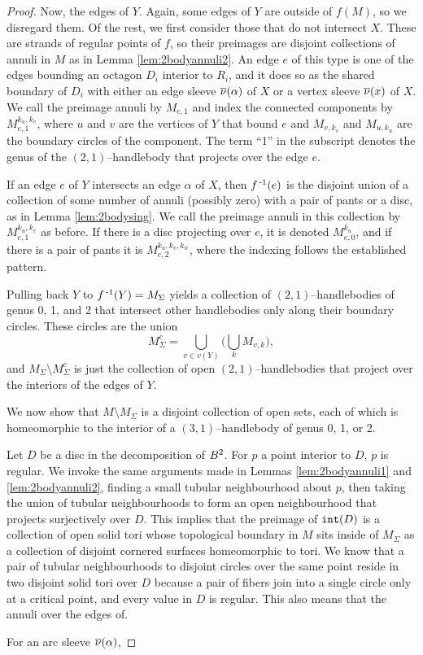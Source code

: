 \begin{proof}
	Now, the edges of $Y$.
	Again, some edges of $Y$ are outside of $f(M)$, so we disregard them.
	Of the rest, we first consider those that do not intersect $X$.
	These are strands of regular points of $f$, so their preimages are disjoint collections of annuli in $M$ as in Lemma \ref{lem:2bodyannuli2}.
	An edge $e$ of this type is one of the edges bounding an octagon $D_i$ interior to $R_i$, and it does so as the shared boundary of $D_i$ with either an edge sleeve $\overline{\nu}(\alpha)$ of $X$ or a vertex sleeve $\overline{\nu}(x)$ of $X$.
	We call the preimage annuli by $M_{e,1}$ and index the connected components by $M_{e,1}^{k_u,k_v}$, where $u$ and $v$ are the vertices of $Y$ that bound $e$ and $M_{v,k_v}$ and $M_{u,k_u}$ are the boundary circles of the component.
	The term ``1'' in the subscript denotes the genus of the $(2,1)$--handlebody that projects over the edge $e$.
	
	If an edge $e$ of $Y$ intersects an edge $\alpha$ of $X$, then $f^{\,\text{-}1}(e)$ is the disjoint union of a collection of some number of annuli (possibly zero) with a pair of pants or a disc, as in Lemma \ref{lem:2bodysing}.
	We call the preimage annuli in this collection by $M_{e,1}^{k_u,k_v}$ as before.
	If there is a disc projecting over $e$, it is denoted $M_{e,0}^{k_u}$, and if there is a pair of pants it is $M_{e,2}^{k_u,k_v,k_w}$, where the indexing follows the established pattern.
	
	Pulling back $Y$ to $f^{\,\text{-}1}(Y)=M_\Sigma$ yields a collection of $(2,1)$--handlebodies of genus 0, 1, and 2 that intersect other handlebodies only along their boundary circles.
	These circles are the union
	\[
		M_\Sigma^c = \bigcup_{v\in v(Y)}\Big( \bigcup_k M_{v,k}\Big),
	\]
	and $M_\Sigma\setminus M_\Sigma^c$ is just the collection of open $(2,1)$--handlebodies that project over the interiors of the edges of $Y$.
	
	We now show that $M\setminus M_\Sigma$ is a disjoint collection of open sets, each of which is homeomorphic to the interior of a $(3,1)$--handlebody of genus 0, 1, or 2.
	
	Let $D$ be a disc in the decomposition of $B^2$.
	For $p$ a point interior to $D$, $p$ is regular.
	We invoke the same arguments made in Lemmas \ref{lem:2bodyannuli1} and \ref{lem:2bodyannuli2}, finding a small tubular neighbourhood about $p$, then taking the union of tubular neighbourhoods to form an open neighbourhood that projects surjectively over $D$.
	This implies that the preimage of $\mathtt{int}(D)$ is a collection of open solid tori whose topological boundary in $M$ sits inside of $M_\Sigma$ as a collection of disjoint cornered surfaces homeomorphic to tori.
	We know that a pair of tubular neighbourhoods to disjoint circles over the same point reside in two disjoint solid tori over $D$ because a pair of fibers join into a single circle only at a critical point, and every value in $D$ is regular.
	This also means that the annuli over the edges of.
	
	For an arc sleeve $\overline{\nu}(\alpha)$, 
	
	
\end{proof}

